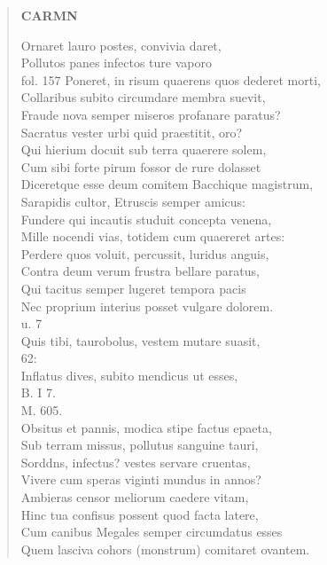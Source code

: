\documentclass[11pt, a4paper]{report}
\begin{document}
\begin{verse}
    \begin{center} \textbf{CARMN} \end{center} \marginpar{[00]} Ornaret lauro postes, convivia daret, \\ Pollutos panes infectos ture vaporo \\ fol. 157 Poneret, in risum quaerens quos dederet morti, \\ Collaribus subito circumdare membra suevit, \\ Fraude nova semper miseros profanare paratus? \\ Sacratus vester urbi quid praestitit, oro? \\ Qui hierium docuit sub terra quaerere solem, \\ Cum sibi forte pirum fossor de rure dolasset \\ Diceretque esse deum comitem Bacchique magistrum, \\ Sarapidis cultor, Etruscis semper amicus: \\ Fundere qui incautis studuit concepta venena, \\ Mille nocendi vias, totidem cum quaereret artes: \\ Perdere quos voluit, percussit, luridus anguis, \\ Contra deum verum frustra bellare paratus, \\ Qui tacitus semper lugeret tempora pacis \\ Nec proprium interius posset vulgare dolorem. \\ u. 7 \\ Quis tibi, taurobolus, vestem mutare suasit, \\ 62: \\ Inflatus dives, subito mendicus ut esses, \\ B. I 7. \\ M. 605. \\ Obsitus et pannis, modica stipe factus epaeta, \\ Sub terram missus, pollutus sanguine tauri, \\ Sorddns, infectus? vestes servare cruentas, \\ Vivere cum speras viginti mundus in annos? \\ Ambieras censor meliorum caedere vitam, \\ Hinc tua confisus possent quod facta latere, \\ Cum canibus Megales semper circumdatus esses \\ Quem lasciva cohors (monstrum) comitaret ovantem. \\ 

\end{verse}
\end{document}
